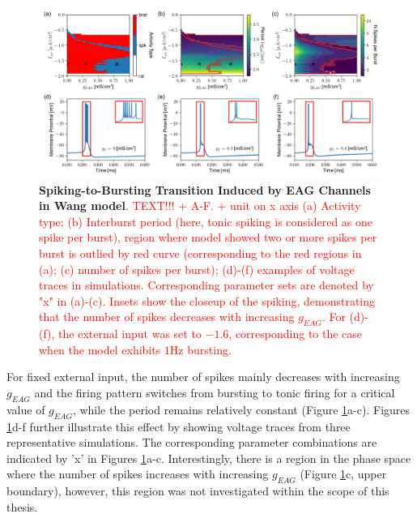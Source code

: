 \documentclass[../main.tex]{subfiles}
\begin{document}
\begin{figure}[!t]
    \centering
    \includegraphics[width=\linewidth]{../img/spiking_to_bursting/spiking_to_bursting.png}
    \caption[Spiking-to-Bursting Transition Induced by EAG Channels in Wang model]{
        \textbf{Spiking-to-Bursting Transition Induced by EAG Channels in Wang model}. \textcolor{red}{TEXT!!! + A-F. + unit on x axis (a) Activity type; (b) Interburst period (here, tonic spiking is considered as one spike per burst), region where model showed two or more spikes per burst is outlied by red curve (corresponding to the red regions in (a); (c) number of spikes per burst); (d)-(f) examples of voltage traces in simulations. Corresponding parameter sets are denoted by "x" in (a)-(c). Insets show the closeup of the spiking, demonstrating that the number of spikes decreases with increasing $g_{EAG}$. For (d)-(f), the external input was set to $-1.6$, corresponding to the case when the model exhibits $1$Hz bursting.}
    }
    \label{fig:spiking_to_bursting_wang_phase_diagram}
\end{figure}

For fixed external input, the number of spikes mainly decreases with increasing $g_{EAG}$ and the firing pattern switches from bursting to tonic firing for a critical value of $g_{EAG}$, while the period remains relatively constant (Figure \ref{fig:spiking_to_bursting_wang_phase_diagram}a-c).
Figures \ref{fig:spiking_to_bursting_wang_phase_diagram}d-f further illustrate this effect by showing voltage traces from three representative simulations. The corresponding parameter combinations are indicated by 'x' in Figures \ref{fig:spiking_to_bursting_wang_phase_diagram}a-c.
Interestingly, there is a region in the phase space where the number of spikes increases with increasing $g_{EAG}$ (Figure \ref{fig:spiking_to_bursting_wang_phase_diagram}c, upper boundary), however, this region was not investigated within the scope of this thesis.
\end{document}
